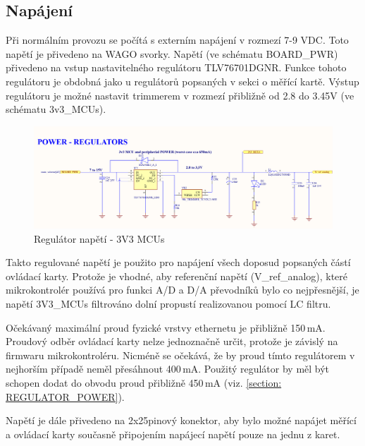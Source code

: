 \clearpage
    \subsection{Napájení}
    Při normálním provozu se počítá s externím napájení v rozmezí 7-9 VDC.
    Toto napětí je přivedeno na WAGO svorky. Napětí (ve schématu BOARD\_PWR)
    přivedeno na vstup nastavitelného regulátoru TLV76701DGNR. Funkce tohoto regulátoru je obdobná
    jako u regulátorů popsaných v sekci o měřící kartě. Výstup regulátoru je možné
    nastavit trimmerem v rozmezí přibližně od 2.8 do 3.45V (ve schématu 3v3\_MCUs).\par

    \begin{figure}[ht!]
        \centering
        \includegraphics[width = 1\textwidth]{obrazky/PWR_REG_3V3.png}
        \caption{Regulátor napětí - 3V3 MCUs}
        \label{fig:Regulátor napětí - 3V3 MCUs}
    \end{figure}

    Takto regulované napětí je použito pro napájení všech doposud popsaných částí ovládací karty.
    Protože je vhodné, aby referenční napětí (V\_ref\_analog),
    které mikrokontrolér používá  pro funkci A/D a D/A převodníků bylo co nejpřesnější, je
    napětí 3V3\_MCUs filtrováno dolní propustí realizovanou pomocí LC filtru.\par

    Očekávaný maximální proud fyzické vrstvy ethernetu je přibližně 150\,mA.
    Proudový odběr ovládací karty nelze jednoznačně určit,
    protože je závislý na firmwaru mikrokontroléru.
    Nicméně se očekává, že by proud tímto regulátorem v nejhorším případě neměl přesáhnout 400\,mA. 
    Použitý regulátor by měl být schopen dodat do obvodu proud přibližně 450\,mA (viz. \ref{section: REGULATOR_POWER}).
    
    Napětí je dále přivedeno na 2x25pinový konektor,
    aby bylo možné napájet měřící a ovládací karty současně připojením napájecí napětí pouze
    na jednu z karet.\par

